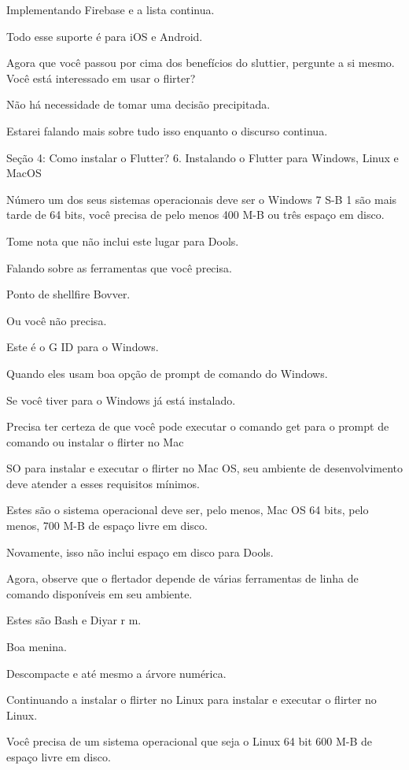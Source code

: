 Implementando Firebase e a lista continua.

Todo esse suporte é para iOS e Android.

Agora que você passou por cima dos benefícios do sluttier, pergunte a si mesmo. Você está interessado em usar o flirter?

Não há necessidade de tomar uma decisão precipitada.

Estarei falando mais sobre tudo isso enquanto o discurso continua.


Seção 4: Como instalar o Flutter?
6. Instalando o Flutter para Windows, Linux e MacOS

Número um dos seus sistemas operacionais deve ser o Windows 7 S-B 1 são mais tarde de 64 bits, você precisa de pelo menos 400 M-B ou três espaço em disco.

Tome nota que não inclui este lugar para Dools.

Falando sobre as ferramentas que você precisa.

Ponto de shellfire Bovver.

Ou você não precisa.

Este é o G ID para o Windows.

Quando eles usam boa opção de prompt de comando do Windows.

Se você tiver para o Windows já está instalado.

Precisa ter certeza de que você pode executar o comando get para o prompt de comando ou instalar o flirter no Mac

SO para instalar e executar o flirter no Mac OS, seu ambiente de desenvolvimento deve atender a esses requisitos mínimos.

Estes são o sistema operacional deve ser, pelo menos, Mac OS 64 bits, pelo menos, 700 M-B de espaço livre em disco.

Novamente, isso não inclui espaço em disco para Dools.

Agora, observe que o flertador depende de várias ferramentas de linha de comando disponíveis em seu ambiente.

Estes são Bash e Diyar r m.

Boa menina.

Descompacte e até mesmo a árvore numérica.

Continuando a instalar o flirter no Linux para instalar e executar o flirter no Linux.

Você precisa de um sistema operacional que seja o Linux 64 bit 600 M-B de espaço livre em disco.


